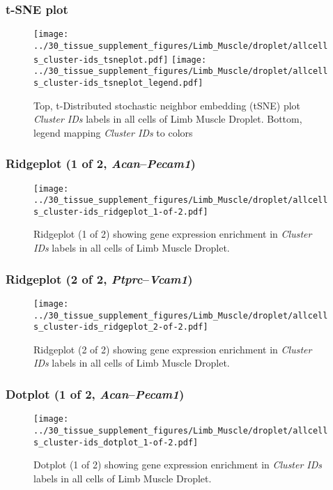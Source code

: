 \clearpage
\subsubsection{t-SNE plot}
\begin{figure}[h]
\centering
\texttt{[image: ../30\_tissue\_supplement\_figures/Limb\_Muscle/droplet/allcells\_cluster-ids\_tsneplot.pdf]}
\texttt{[image: ../30\_tissue\_supplement\_figures/Limb\_Muscle/droplet/allcells\_cluster-ids\_tsneplot\_legend.pdf]}
\caption{Top, t-Distributed stochastic neighbor embedding (tSNE) plot  \emph{Cluster IDs} labels in all cells of Limb Muscle Droplet. Bottom, legend mapping \emph{Cluster IDs} to colors}
\end{figure}


\clearpage

\subsubsection{Ridgeplot (1 of 2, \emph{Acan}--\emph{Pecam1})}
\begin{figure}[h]
\centering
\texttt{[image: ../30\_tissue\_supplement\_figures/Limb\_Muscle/droplet/allcells\_cluster-ids\_ridgeplot\_1-of-2.pdf]}

\caption{ Ridgeplot (1 of 2)  showing gene expression enrichment in \emph{Cluster IDs} labels in all cells of Limb Muscle Droplet. }
\end{figure}


\clearpage

\subsubsection{Ridgeplot (2 of 2, \emph{Ptprc}--\emph{Vcam1})}
\begin{figure}[h]
\centering
\texttt{[image: ../30\_tissue\_supplement\_figures/Limb\_Muscle/droplet/allcells\_cluster-ids\_ridgeplot\_2-of-2.pdf]}

\caption{ Ridgeplot (2 of 2)  showing gene expression enrichment in \emph{Cluster IDs} labels in all cells of Limb Muscle Droplet. }
\end{figure}


\clearpage

\subsubsection{Dotplot (1 of 2, \emph{Acan}--\emph{Pecam1})}
\begin{figure}[h]
\centering
\texttt{[image: ../30\_tissue\_supplement\_figures/Limb\_Muscle/droplet/allcells\_cluster-ids\_dotplot\_1-of-2.pdf]}

\caption{ Dotplot (1 of 2)  showing gene expression enrichment in \emph{Cluster IDs} labels in all cells of Limb Muscle Droplet. }
\end{figure}



